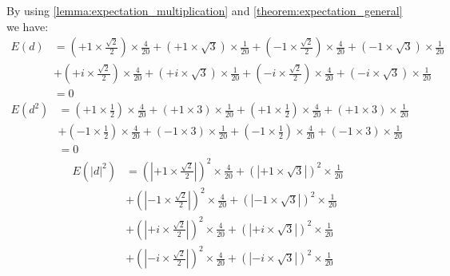 \begin{Proof}
	By using \cref{lemma:expectation_multiplication} and \cref{theorem:expectation_general} we have:
	\begin{equation*}
		\begin{split}
		E(d) &= \left(+1 \times \frac{\sqrt{2}}{2}\right) \times \frac{4}{20} + \left(+1 \times \sqrt{3}\right) \times \frac{1}{20}+\left(-1 \times \frac{\sqrt{2}}{2}\right) \times \frac{4}{20}+\left(-1 \times \sqrt{3}\right) \times \frac{1}{20}\\
		     &+ \left(+i \times \frac{\sqrt{2}}{2}\right) \times \frac{4}{20} + \left(+i \times \sqrt{3}\right) \times \frac{1}{20}+\left(-i \times \frac{\sqrt{2}}{2}\right) \times \frac{4}{20}+\left(-i \times \sqrt{3}\right) \times \frac{1}{20}\\ 
			 &= 0
		\end{split}
	  \end{equation*}
	  \begin{equation*}
		\begin{split}
		E(d^2) &= \left(+1 \times \frac{1}{2}\right) \times \frac{4}{20} + \left(+1 \times 3\right) \times \frac{1}{20}+\left(+1 \times \frac{1}{2}\right) \times \frac{4}{20}+\left(+1 \times 3\right) \times \frac{1}{20}\\
		     &+ \left(-1 \times \frac{1}{2}\right) \times \frac{4}{20} + \left(-1 \times 3\right) \times \frac{1}{20}+\left(-1 \times \frac{1}{2}\right) \times \frac{4}{20}+\left(-1 \times 3\right) \times \frac{1}{20}\\ 
			 &= 0
		\end{split}
	 \end{equation*}
	 \begin{equation*}
		\begin{split}
		E(\left|d\right|^2) &= \left(\left|+1 \times \frac{\sqrt{2}}{2} \right|\right)^2\times \frac{4}{20} + \left(\left|+1 \times \sqrt{3}\right|\right)^2\times \frac{1}{20}\\
		                    &+\left(\left|-1 \times \frac{\sqrt{2}}{2}\right|\right)^2\times \frac{4}{20}+\left(\left|-1 \times \sqrt{3}\right|\right)^2\times \frac{1}{20}\\
		                    &+ \left(\left|+i \times \frac{\sqrt{2}}{2}\right|\right)^2\times \frac{4}{20} + \left(\left|+i \times \sqrt{3}\right|\right)^2\times \frac{1}{20}\\
							&+\left(\left|-i \times \frac{\sqrt{2}}{2}\right|\right)^2\times \frac{4}{20}+\left(\left|-i \times \sqrt{3}\right|\right)^2\times \frac{1}{20}\\ 

\end{split}
\end{equation*}
\end{Proof}
